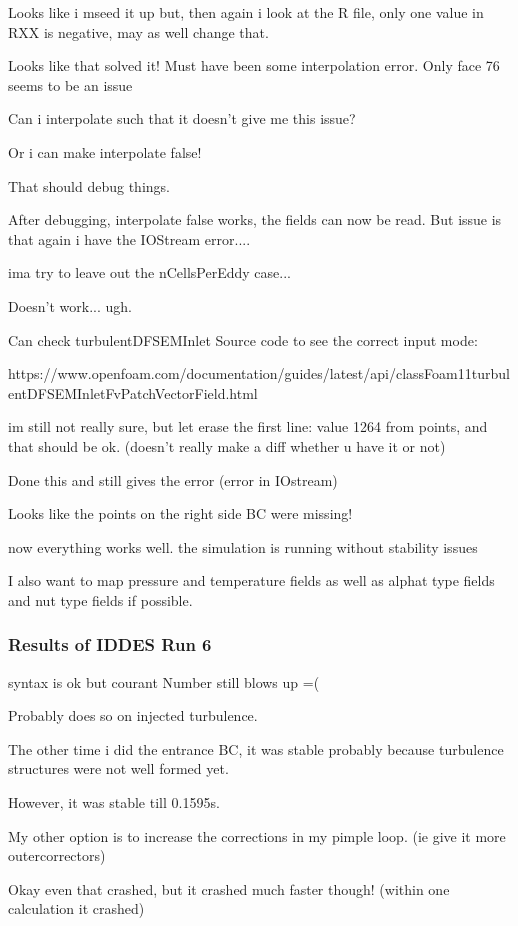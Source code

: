 \documentclass[12pt]{article}
\renewcommand{\_}{\kern-1.5pt\textunderscore\kern-1.5pt}
\begin{document}
Looks like i mseed it up but, then again i look at the R file, only
one value in R\_XX is negative, may as well change that.

Looks like that solved it! Must have been some interpolation error.
Only face 76 seems to be an issue

Can i interpolate such that it doesn't give me this issue?

Or i can make interpolate false!

That should debug things. 

After debugging, interpolate false works, the fields can now be read.
But issue is that again i have the IOStream error....

ima try to leave out the nCellsPerEddy case...

Doesn't work... ugh.

Can check turbulentDFSEMInlet Source code to see the correct input
mode:

https://www.openfoam.com/documentation/guides/latest/api/classFoam\_1\_1turbulentDFSEMInletFvPatchVectorField.html

im still not really sure, but let erase the first line: value 1264
from points, and that should be ok. (doesn't really make a diff whether
u have it or not)

Done this and still gives the error (error in IOstream)

Looks like the points on the right side BC were missing!

now everything works well. the simulation is running without stability
issues

I also want to map pressure and temperature fields as well as alphat
type fields and nut type fields if possible.

\subsubsection{Results of IDDES Run 6}
syntax is ok but courant Number still blows up =(

Probably does so on injected turbulence.

The other time i did the entrance BC, it was stable probably because
turbulence structures were not well formed yet. 

However, it was stable till 0.1595s.

My other option is to increase the corrections in my pimple loop.
(ie give it more outercorrectors)

Okay even that crashed, but it crashed much faster though! (within
one calculation it crashed)
\end{document}
